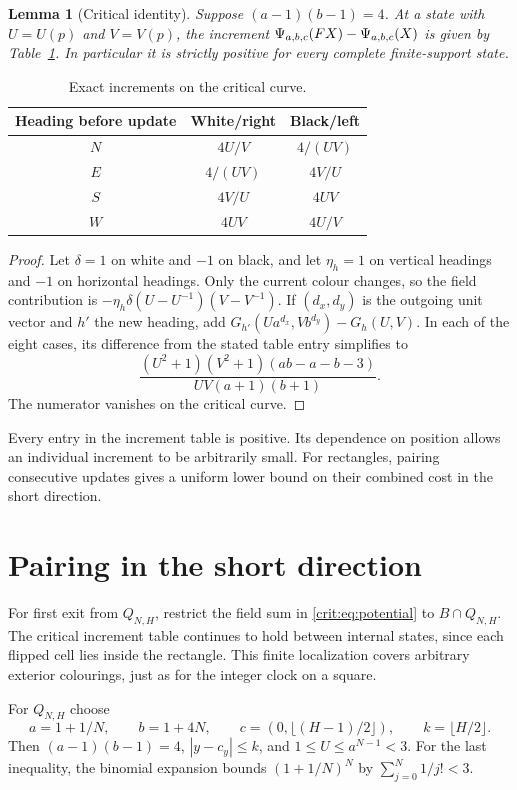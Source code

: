 \documentclass[11pt,a4paper]{article}
\newtheorem{lemma}[theorem]{Lemma}
\theoremstyle{remark}\newtheorem{remark}[theorem]{Remark}
\begin{document}
\begin{lemma}[Critical identity]\label{crit:lem:identity}
Suppose $(a-1)(b-1)=4$. At a state with $U=U(p)$ and $V=V(p)$, the increment
$\Psi_{a,b,c}(FX)-\Psi_{a,b,c}(X)$ is given by Table~\ref{crit:tab:increments}. In particular it
is strictly positive for every complete finite-support state.
\end{lemma}
\begin{table}[ht]
\centering
\begin{tabular}{ccc}\toprule
Heading before update & White/right & Black/left\\\midrule
$N$ & $4U/V$ & $4/(UV)$\\
$E$ & $4/(UV)$ & $4V/U$\\
$S$ & $4V/U$ & $4UV$\\
$W$ & $4UV$ & $4U/V$\\\bottomrule
\end{tabular}
\caption{Exact increments on the critical curve.}\label{crit:tab:increments}
\end{table}
\begin{proof}
Let $\delta=1$ on white and $-1$ on black, and let $\eta_h=1$ on vertical
headings and $-1$ on horizontal headings. Only the current colour changes, so
the field contribution is
$-\eta_h\delta(U-U^{-1})(V-V^{-1})$.
If $(d_x,d_y)$ is the outgoing unit vector and $h'$ the new heading, add
$G_{h'}(Ua^{d_x},Vb^{d_y})-G_h(U,V)$. In each of the eight cases, its difference
from the stated table entry simplifies to
\[
 \frac{(U^2+1)(V^2+1)(ab-a-b-3)}{UV(a+1)(b+1)}.
\]
The numerator vanishes on the critical curve.
\end{proof}

Every entry in the increment table is positive. Its dependence on position
allows an individual increment to be arbitrarily small. For rectangles,
pairing consecutive updates gives a uniform lower bound on their combined
cost in the short direction.

\section{Pairing in the short direction}
For first exit from $Q_{N,H}$, restrict the field sum in
\eqref{crit:eq:potential} to $B\cap Q_{N,H}$. The critical increment table
continues to hold between internal states, since each flipped cell lies
inside the rectangle. This finite localization covers arbitrary exterior
colourings, just as for the integer clock on a square.

For $Q_{N,H}$ choose
\[
 a=1+1/N,\qquad b=1+4N,\qquad
 c=(0,\lfloor(H-1)/2\rfloor),\qquad k=\lfloor H/2\rfloor.
\]
Then $(a-1)(b-1)=4$, $|y-c_y|\le k$, and $1\le U\le a^{N-1}<3$.
For the last inequality, the binomial expansion bounds
$(1+1/N)^N$ by $\sum_{j=0}^N1/j!<3$.
\end{document}
